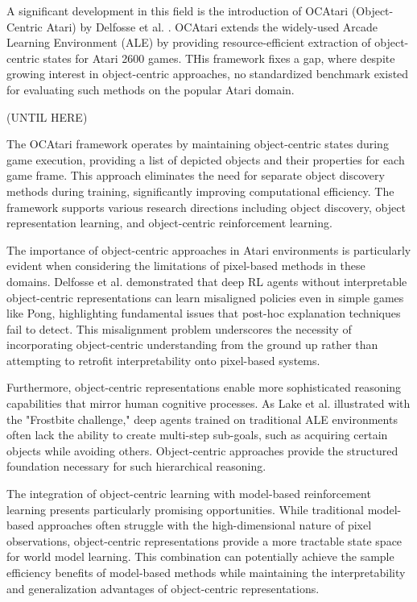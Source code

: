 \documentclass[
	english,
	ruledheaders=section,
	class=report,
	thesis={type=master},
	accentcolor=9c,
	custommargins=true,
	marginpar=false,
	parskip=half-,
	fontsize=11pt,
]{tudapub}
\begin{document}
A significant development in this field is the introduction of OCAtari (Object-Centric Atari) by Delfosse et al. \cite{delfosse2024ocatariobjectcentricatari2600}. OCAtari extends the widely-used Arcade
 Learning Environment (ALE) by providing resource-efficient extraction of object-centric states for Atari 2600 games. THis framework fixes a gap, where despite growing interest in object-centric approaches,
no standardized benchmark existed for evaluating such methods on the popular Atari domain.

(UNTIL HERE)

The OCAtari framework operates by maintaining object-centric states during game execution, providing a list of depicted objects and their properties for each game frame. This approach eliminates the need 
for separate object discovery methods during training, significantly improving computational efficiency. The framework supports various research directions including object discovery, object representation learning, and object-centric reinforcement learning.

The importance of object-centric approaches in Atari environments is particularly evident when considering the limitations of pixel-based methods in these domains. Delfosse et al. demonstrated that deep 
RL agents without interpretable object-centric representations can learn misaligned policies even in simple games like Pong, highlighting fundamental issues that post-hoc explanation techniques fail to detect. 
This misalignment problem underscores the necessity of incorporating object-centric understanding from the ground up rather than attempting to retrofit interpretability onto pixel-based systems.

Furthermore, object-centric representations enable more sophisticated reasoning capabilities that mirror human cognitive processes. As Lake et al. illustrated with the "Frostbite challenge," deep agents 
trained on traditional ALE environments often lack the ability to create multi-step sub-goals, such as acquiring certain objects while avoiding others. Object-centric approaches provide the structured foundation necessary for such hierarchical reasoning.

The integration of object-centric learning with model-based reinforcement learning presents particularly promising opportunities. While traditional model-based approaches often struggle with the high-dimensional 
nature of pixel observations, object-centric representations provide a more tractable state space for world model learning. This combination can potentially achieve the sample efficiency benefits of model-based methods while maintaining the interpretability and generalization advantages of object-centric representations.
\end{document}
